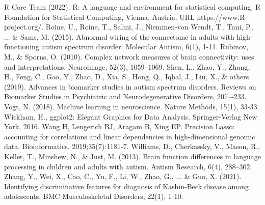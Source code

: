 \documentclass[11pt,conference]{IEEEtran}
\begin{document}
\begin{thebibliography}{00}
     {R Core Team (2022). R: A language and environment for statistical computing. R Foundation for Statistical Computing, Vienna, Austria. URL https://www.R-project.org/.}
     {Roine, U., Roine, T., Salmi, J., Nieminen-von Wendt, T., Tani, P., ... \& Sams, M. (2015). Abnormal wiring of the connectome in adults with high-functioning autism spectrum disorder. Molecular Autism, 6(1), 1-11.}
     {Rubinov, M., \& Sporns, O. (2010). Complex network measures of brain connectivity: uses and interpretations. Neuroimage, 52(3), 1059--1069.}
     {Shen, L., Zhao, Y., Zhang, H., Feng, C., Gao, Y., Zhao, D., Xia, S., Hong, Q., Iqbal, J., Liu, X., \& others (2019). Advances in biomarker studies in autism spectrum disorders. Reviews on Biomarker Studies in Psychiatric and Neurodegenerative Disorders, 207–-233.}
     {Vogt, N. (2018). Machine learning in neuroscience. Nature Methods, 15(1), 33-33.}    
     {Wickham, H., ggplot2: Elegant Graphics for Data Analysis. Springer-Verlag New York, 2016.}
     {Wang H, Lengerich BJ, Aragam B, Xing EP. Precision Lasso: accounting for correlations and linear dependencies in high-dimensional genomic data. Bioinformatics. 2019;35(7):1181-7.}
     {Williams, D., Cherkassky, V., Mason, R., Keller, T., Minshew, N., \& Just, M. (2013). Brain function differences in language processing in children and adults with autism. Autism Research, 6(4), 288--302.}
     {Zhang, Y., Wei, X., Cao, C., Yu, F., Li, W., Zhao, G., ... \& Guo, X. (2021). Identifying discriminative features for diagnosis of Kashin-Beck disease among adolescents. BMC Musculoskeletal Disorders, 22(1), 1-10.}

\end{thebibliography}
\end{document}
